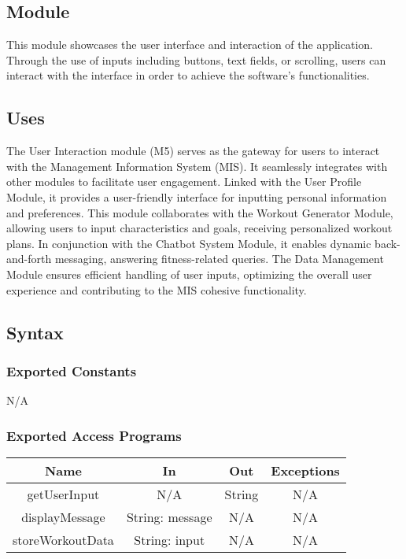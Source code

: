 \documentclass[12pt, titlepage]{article}
\begin{document}
\subsection{Module}
This module showcases the user interface and interaction of the application. Through the use of inputs including buttons, text fields, or scrolling, users can interact with the interface in order to achieve the software's functionalities. 

\subsection{Uses}
The User Interaction module (M5) serves as the gateway for users to interact with the Management Information System (MIS). It seamlessly integrates with other modules to facilitate user engagement. Linked with the User Profile Module, it provides a user-friendly interface for inputting personal information and preferences. This module collaborates with the Workout Generator Module, allowing users to input characteristics and goals, receiving personalized workout plans. In conjunction with the Chatbot System Module, it enables dynamic back-and-forth messaging, answering fitness-related queries. The Data Management Module ensures efficient handling of user inputs, optimizing the overall user experience and contributing to the MIS cohesive functionality.

\subsection{Syntax}

\subsubsection{Exported Constants}
N/A

\subsubsection{Exported Access Programs}

\begin{center}
\begin{tabular}{c c c c}
\hline
\textbf{Name} & \textbf{In} & \textbf{Out} & \textbf{Exceptions} \\
\hline
getUserInput & N/A & String & N/A \\
displayMessage & String: message & N/A & N/A \\
storeWorkoutData & String: input & N/A & N/A \\

\hline
\end{tabular}
\end{center}
\end{document}
